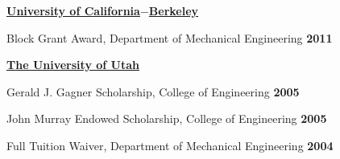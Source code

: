 %
\href{http://www.berkeley.edu}{\textbf{University of California$-$Berkeley}}
\begin{innerlist}
\item Block Grant Award, Department of Mechanical Engineering \hfill \textbf{2011}
\end{innerlist}

\halfblankline

\href{http://www.utah.edu}{\textbf{The University of Utah}}
\begin{innerlist}
\item Gerald J. Gagner Scholarship, College of Engineering \hfill \textbf{2005}
\item John Murray Endowed Scholarship, College of Engineering \hfill \textbf{2005}
\item Full Tuition Waiver, Department of Mechanical Engineering \hfill \textbf{2004}
\end{innerlist}